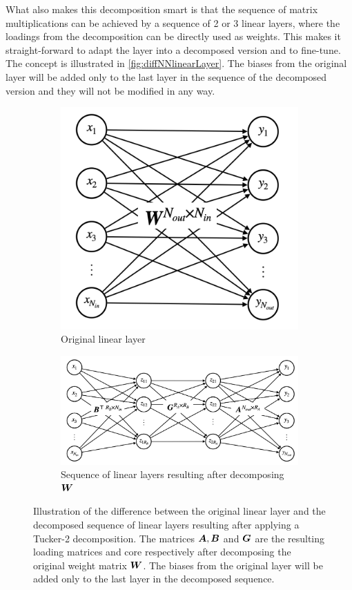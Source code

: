 What also makes this decomposition smart is that the sequence of matrix multiplications can be achieved by a sequence of 2 or 3 linear layers, where the loadings from the decomposition can be directly used as weights. This makes it straight-forward to adapt the layer into a decomposed version and to fine-tune. The concept is illustrated in \autoref{fig:diffNNlinearLayer}. The biases from the original layer will be added only to the last layer in the sequence of the decomposed version and they will not be modified in any way.
\begin{figure}
    \centering
    \begin{subfigure}{0.35\linewidth}
        \centering
        \includegraphics[width=\linewidth]{Pics/05_methodology/NNlinearLayer.png}
        \caption{Original linear layer}
    \end{subfigure}
    \begin{subfigure}{\linewidth}
        \centering
        \includegraphics[width=.7\linewidth]{Pics/05_methodology/NNdecompLinearLayer.png}
        \caption{Sequence of linear layers resulting after decomposing $\boldsymbol{W}$}
    \end{subfigure}
    \captionsetup{width=.9\linewidth}
    \caption{Illustration of the difference between the original linear layer and the decomposed sequence of linear layers resulting after applying a Tucker-2 decomposition. The matrices $\boldsymbol{A}, \boldsymbol{B}$ and $\boldsymbol{G}$ are the resulting loading matrices and core respectively after decomposing the original weight matrix $\boldsymbol{W}$. The biases from the original layer will be added only to the last layer in the decomposed sequence.}
    \label{fig:diffNNlinearLayer}
\end{figure}

